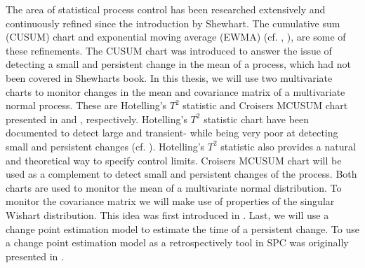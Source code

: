 The area of statistical process control has been researched extensively and continuously refined since the introduction by Shewhart. The cumulative sum (CUSUM) chart and exponential moving average (EWMA) (cf. \citet{ESPAGE}, \citet{EWMA}), are some of these refinements. The CUSUM chart was introduced to answer the issue of detecting a small and persistent change in the mean of a process, which had not been covered in Shewharts book. In this thesis, we will use two multivariate charts to monitor changes in the mean and covariance matrix of a multivariate normal process. These are Hotelling's $T^2$ statistic and Croisers MCUSUM chart presented in \citet{HotellingQC} and \citet{Croiser1988}, respectively. Hotelling's $T^2$ statistic chart have been documented to detect large and transient- while being very poor at detecting small and persistent changes (cf. \citet{Croiser1988}). Hotelling's $T^2$ statistic also provides a natural and theoretical way to specify control limits. Croisers MCUSUM chart will be used as a complement to detect small and persistent changes of the process. Both charts are used to monitor the mean of a multivariate normal distribution. To monitor the covariance matrix we will make use of properties of the singular Wishart distribution. This idea was first introduced in \citet{Bodnar2009}. Last, we will use a change point estimation model to estimate the time of a persistent change. To use a change point estimation model as a retrospectively tool in SPC was originally presented in \citet{pignatiello2001estimation}.



